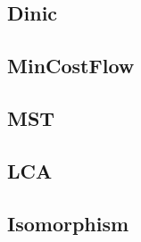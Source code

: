 \subsection{Dinic}


\subsection{MinCostFlow}


\subsection{MST}


\subsection{LCA}


\subsection{Isomorphism}

